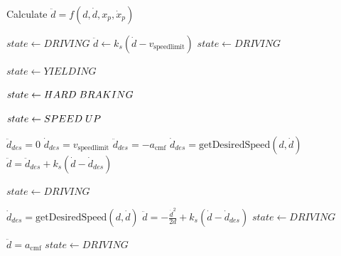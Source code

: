 \documentclass[letterpaper, 10 pt, conference]{ieeeconf}  %
\begin{document}
\begin{algorithm} %
\caption{Calculate $\ddot{d} = f(d, \dot{d}, x_p, \dot{x}_p)$} %
\label{alg:hybridController} %
\begin{algorithmic}
\State $state \leftarrow DRIVING$
	\State $\ddot{d} \gets k_s(\dot{d}-v_\mathrm{speed limit})$ 
		\State $state \leftarrow DRIVING$
		
		\State $state \leftarrow YIELDING$



	\State $state \leftarrow HARD\hspace{1mm}BRAKING$

	\Else
	\State $state \leftarrow SPEED\hspace{1mm}UP$

	\EndIf
	\EndIf
	\EndIf
\vspace{3mm}
	\State $\ddot{d}_{des} = 0$
	\State $\dot{d}_{des} = v_\mathrm{speed limit}$
\Else 
	\State $\ddot{d}_{des} = -a_\mathrm{cmf}$
	\State $\dot{d}_{des} = \mathrm{getDesiredSpeed}(d, \dot{d})$
\EndIf 
	\State $\ddot{d} = \ddot{d}_{des} + k_s(\dot{d} - \dot{d}_{des})$

 \State $state \leftarrow DRIVING$

\EndIf
\EndIf

\vspace{3mm}

	\State $\dot{d}_{des} = \mathrm{getDesiredSpeed}(d, \dot{d})$
	\State $\ddot{d} = -\frac{\dot{d}^2}{2d} + k_s(\dot{d} - \dot{d}_{des})$ 	
	 \State $state \leftarrow DRIVING$

	\EndIf
	\EndIf


\EndIf
{}
	\State $\ddot{d} = a_\mathrm{cmf}$ 	
	 \State $state \leftarrow DRIVING$

	\EndIf
	\EndIf


\EndWhile

\end{algorithmic}
\end{algorithm}
\end{document}
